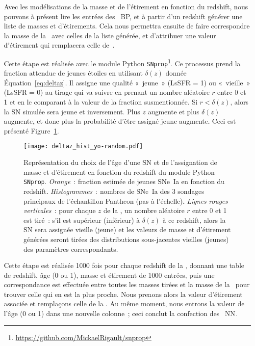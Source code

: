 \documentclass[../main/main.tex]{subfiles}
\begin{document}
Avec les modélisations de la masse et de l'étirement en fonction du redshift,
nous pouvons à présent lire les entrées des \hostlib\ BP, et à partir d'un
redshift générer une liste de masses et d'étirements. Cela nous permettra
ensuite de faire correspondre la masse de la \hostlib\ avec celles de la liste
générée, et d'attribuer une valeur d'étirement qui remplacera celle
de~.

Cette étape est réalisée avec le module Python
\texttt{SNprop}\footnote{\label{fn:snprop}\href{
    https://github.com/MickaelRigault/snprop}
{https://github.com/MickaelRigault/snprop}}. Ce processus prend la fraction
attendue de jeunes étoiles en utilisant $\delta(z)$ donnée
Équation~\ref{eq:deltaz}. Il assigne une qualité «~jeune~» (LsSFR = 1) ou
«~vieille~» (LsSFR = 0) au tirage qui va suivre en prenant un nombre aléatoire
$r$ entre 0 et 1 et en le comparant à la valeur de la fraction susmentionnée. Si
$r < \delta(z)$, alors la SN simulée sera jeune et inversement. Plus $z$
augmente et plus $\delta(z)$ augmente, et donc plus la probabilité d'être
assigné jeune augmente. Ceci est présenté Figure~\ref{fig:deltaz_rand}.

\begin{figure}[]
    \centering
    \texttt{[image: deltaz\_hist\_yo-random.pdf]}
    \caption[Représentation du choix de l'âge d'une SN et de l'assignation de
    masse et d'étirement en fonction du redshift]{Représentation du choix de
        l'âge d'une SN et de l'assignation de masse et d'étirement en fonction
        du redshift du module Python \texttt{SNprop}.
        \textit{Orange}~: fraction estimée de jeunes SNe~Ia en fonction du
        redshift. \textit{Histogrammes}~: nombres de SNe~Ia des 3 sondages
        principaux de l'échantillon Pantheon \citep{scolnic2018} (pas à
        l'échelle). \textit{Lignes rouges verticales}~: pour chaque $z$ de la
        \hostlib, un nombre aléatoire $r$ entre 0 et 1 est tiré~: s'il est
        supérieur (inférieur) à $\delta(z)$ à ce redshift, alors la SN sera
        assignée vieille (jeune) et les valeurs de masse et d'étirement générées
        seront tirées des distributions sous-jacentes vieilles (jeunes) des
    paramètres correspondants.}
    \label{fig:deltaz_rand}
\end{figure}

Cette étape est réalisée \num{1000} fois pour chaque redshift de la \hostlib,
donnant une table de redshift, âge (0 ou 1), masse et étirement de \num{1000}
entrées, puis une correspondance est effectuée entre toutes les masses tirées et
la masse de la \hostlib\ pour trouver celle qui en est la plus proche. Nous
prenons alors la valeur d'étirement associée et remplaçons celle de la \hostlib.
Au même moment, nous entrons la valeur de l'âge (0 ou 1) dans une nouvelle
colonne~; ceci conclut la confection des \hostlib\ NN.
\end{document}
